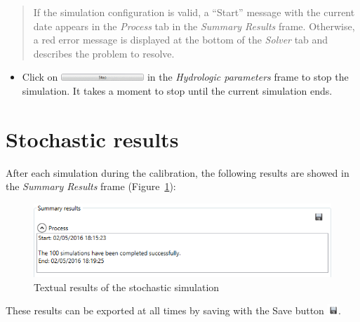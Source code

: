 \documentclass[
  letterpaper,
  DIV=11,
  numbers=noendperiod]{scrreprt}
\providecommand{\tightlist}{%
  \setlength{\itemsep}{0pt}\setlength{\parskip}{0pt}}\usepackage{longtable,booktabs,array}
\begin{document}
\begin{quote}
If the simulation configuration is valid, a ``Start'' message with the
current date appears in the \emph{Process} tab in the \emph{Summary
Results} frame. Otherwise, a red error message is displayed at the
bottom of the \emph{Solver} tab and describes the problem to resolve.
\end{quote}

\begin{itemize}
\tightlist
\item
  {Click on
  \includegraphics[width=\textwidth,height=0.11in]{./figures/fig-icon_calibrator_stop.png}
  in the \emph{Hydrologic parameters} frame to stop the simulation. It
  takes a moment to stop until the current simulation ends.}
\end{itemize}

\hypertarget{stochastic-results}{%
\section{Stochastic results}\label{stochastic-results}}

After each simulation during the calibration, the following results are
showed in the \emph{Summary Results} frame
(Figure~\ref{fig-stochastic_simulation_textual_results}):

\begin{figure}

{\centering \includegraphics{./figures/fig-stochastic_simulation_textual_results.png}

}

\caption{\label{fig-stochastic_simulation_textual_results}Textual
results of the stochastic simulation}

\end{figure}

These results can be exported at all times by saving with the Save
button
\includegraphics[width=0.16in,height=0.16in]{./figures/fig-icon_save_button.png}.
\end{document}
